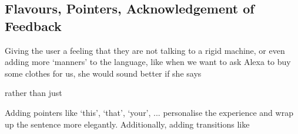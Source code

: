 \begin{flushright}
\end{flushright}





\subsection*{Flavours, Pointers, Acknowledgement of Feedback}
Giving the user a feeling that they are not talking to a rigid machine, or even adding more `manners' to the language, like when we want to ask Alexa to buy some clothes for us, she would sound better if she says 



\begin{flushright}
\end{flushright}


\noindent rather than just 


\begin{flushright}
\end{flushright}



\noindent Adding pointers like `this', `that', `your', ... personalise the experience and wrap up the sentence more elegantly. Additionally, adding transitions like 
\begin{flushright}
\end{flushright}



